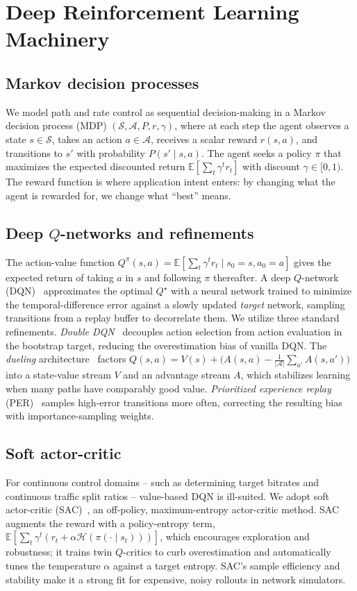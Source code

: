 \section{Deep Reinforcement Learning Machinery}
\label{sec:background:rl}

\subsection{Markov decision processes}
We model path and rate control as sequential decision-making in a Markov decision process (MDP)
$(\mathcal{S}, \mathcal{A}, P, r, \gamma)$, where at each step the agent observes a state
$s \in \mathcal{S}$, takes an action $a \in \mathcal{A}$, receives a scalar reward
$r(s,a)$, and transitions to $s'$ with probability $P(s' \mid s, a)$. The agent seeks a policy
$\pi$ that maximizes the expected discounted return $\mathbb{E}\!\left[\sum_t \gamma^t r_t\right]$
with discount $\gamma \in [0,1)$. The reward function is where application intent enters: by
changing what the agent is rewarded for, we change what ``best'' means.

\subsection{Deep $Q$-networks and refinements}
The action-value function $Q^\pi(s,a) = \mathbb{E}[\sum_t \gamma^t r_t \mid s_0=s, a_0=a]$ gives the
expected return of taking $a$ in $s$ and following $\pi$ thereafter. A deep $Q$-network
(DQN)~\cite{Mnih2015} approximates the optimal $Q^\star$ with a neural network trained to minimize
the temporal-difference error against a slowly updated \emph{target} network, sampling transitions
from a replay buffer to decorrelate them. We utilize three standard refinements. \emph{Double
DQN}~\cite{VanHasselt2016} decouples action selection from action evaluation in the bootstrap
target, reducing the overestimation bias of vanilla DQN. The \emph{dueling}
architecture~\cite{Wang2016} factors $Q(s,a) = V(s) + \big(A(s,a) - \tfrac{1}{|\mathcal{A}|}\sum_{a'}
A(s,a')\big)$ into a state-value stream $V$ and an advantage stream $A$, which stabilizes learning 
when many paths have comparably good value. \emph{Prioritized experience replay} 
(PER)~\cite{Schaul2016} samples high-error transitions more often, correcting the resulting bias with 
importance-sampling weights.

\subsection{Soft actor-critic}
For continuous control domains -- such as determining target bitrates and continuous traffic split ratios -- 
value-based DQN is ill-suited. We adopt soft actor-critic (SAC)~\cite{Haarnoja2018}, an
off-policy, maximum-entropy actor-critic method. SAC augments the reward with a policy-entropy term,
$\mathbb{E}[\sum_t \gamma^t (r_t + \alpha \mathcal{H}(\pi(\cdot\mid s_t)))]$, which encourages
exploration and robustness; it trains twin $Q$-critics to curb overestimation and automatically tunes the
temperature $\alpha$ against a target entropy. SAC's sample efficiency and stability make it a 
strong fit for expensive, noisy rollouts in network simulators.

